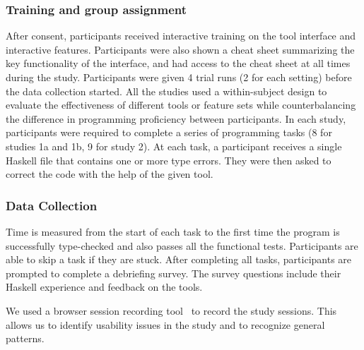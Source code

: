 \subsubsection*{\textbf{Training and group assignment}}
After consent, participants received interactive training on the tool interface and interactive features. Participants were also shown a cheat sheet summarizing the key functionality of the interface, and had access to the cheat sheet at all times during the study. Participants were given 4 trial runs (2 for each setting) before the data collection started. 
All the studies used a within-subject design to evaluate the effectiveness of different tools or feature sets while counterbalancing the difference in programming proficiency between participants. In each study, participants were required to complete a series of programming tasks (8 for studies 1a and 1b, 9 for study 2). At each task, a participant receives a single Haskell file that contains one or more type errors. They were then asked to correct the code with the help of the given tool.


\subsubsection*{\textbf{Data Collection}}
Time is measured from the start of each task to the first time the program is successfully type-checked and also passes all the functional tests. Participants are able to skip a task if they are stuck. 
After completing all tasks, participants are prompted to complete a debriefing survey. The survey questions include their Haskell experience and feedback on the tools.

We used a browser session recording tool~\cite{openreplay_openreplay_2022} to record the study sessions. This allows us to identify usability issues in the study and to recognize general patterns. 

